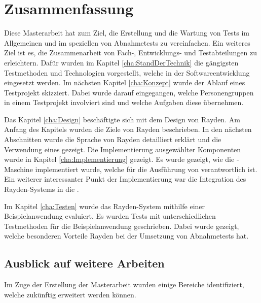 \chapter{Zusammenfassung}
\label{cha:Zusammenfassung}

Diese Masterarbeit hat zum Ziel, die Erstellung und die Wartung von Tests im Allgemeinen und im speziellen von Abnahmetests zu vereinfachen. Ein weiteres Ziel ist es, die Zusammenarbeit von Fach-, Entwicklungs- und Testabteilungen zu erleichtern. Dafür wurden im Kapitel \ref{cha:StandDerTechnik} die gängigsten Testmethoden und Technologien vorgestellt, welche in der Softwareentwicklung eingesetzt werden. Im nächsten Kapitel \ref{cha:Konzept} wurde der Ablauf eines Testprojekt skizziert. Dabei wurde darauf eingegangen, welche Personengruppen in einem Testprojekt involviert sind und welche Aufgaben diese übernehmen. 

\SuperPar
Das Kapitel \ref{cha:Design} beschäftigte sich mit dem Design von Rayden. Am Anfang des Kapitels wurden die Ziele von Rayden beschrieben. In den nächsten Abschnitten wurde die Sprache von Rayden detailliert erklärt und die Verwendung eines  gezeigt. Die Implementierung ausgewählter Komponenten wurde in Kapitel \ref{cha:Implementierung} gezeigt. Es wurde gezeigt, wie die -Maschine implementiert wurde, welche für die Ausführung von  verantwortlich ist. Ein weiterer interessanter Punkt der Implementierung war die Integration des Rayden-Systems in die . 

\SuperPar
Im Kapitel \ref{cha:Testen} wurde das Rayden-System mithilfe einer Beispielanwendung evaluiert. Es wurden Tests mit unterschiedlichen Testmethoden für die Beispielanwendung geschrieben. Dabei wurde gezeigt, welche besonderen Vorteile Rayden bei der Umsetzung von Abnahmetests hat.

\pagebreak
\section{Ausblick auf weitere Arbeiten}

Im Zuge der Erstellung der Masterarbeit wurden einige Bereiche identifiziert, welche zukünftig erweitert werden können.\\

